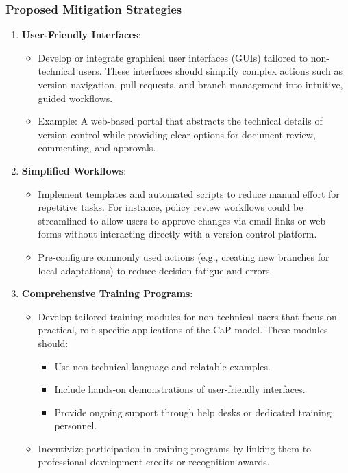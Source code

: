 \documentclass[11pt]{article}
\begin{document}
	\subsubsection{Proposed Mitigation Strategies}
	\begin{enumerate}
		\item \textbf{User-Friendly Interfaces}:
		\begin{itemize}
			\item Develop or integrate graphical user interfaces (GUIs) tailored to non-technical users. These interfaces should simplify complex actions such as version navigation, pull requests, and branch management into intuitive, guided workflows.
			\item Example: A web-based portal that abstracts the technical details of version control while providing clear options for document review, commenting, and approvals.
		\end{itemize}
		\item \textbf{Simplified Workflows}:
		\begin{itemize}
			\item Implement templates and automated scripts to reduce manual effort for repetitive tasks. For instance, policy review workflows could be streamlined to allow users to approve changes via email links or web forms without interacting directly with a version control platform.
			\item Pre-configure commonly used actions (e.g., creating new branches for local adaptations) to reduce decision fatigue and errors.
		\end{itemize}
		\item \textbf{Comprehensive Training Programs}:
		\begin{itemize}
			\item Develop tailored training modules for non-technical users that focus on practical, role-specific applications of the CaP model. These modules should:
			\begin{itemize}
				\item Use non-technical language and relatable examples.
				\item Include hands-on demonstrations of user-friendly interfaces.
				\item Provide ongoing support through help desks or dedicated training personnel.
			\end{itemize}
			\item Incentivize participation in training programs by linking them to professional development credits or recognition awards.

\end{itemize}
\end{enumerate}
\end{document}
